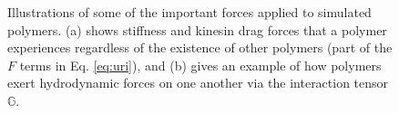 \documentclass[11pt]{ucthesis}
\begin{document}
\begin{figure}
\centering
{}
\caption{Illustrations of some of the important forces applied to simulated polymers. (a) shows stiffness and kinesin drag forces that a polymer experiences regardless of the existence of other polymers (part of the $F$ terms in Eq. \ref{eq:uri}), and (b) gives an example of how polymers exert hydrodynamic forces on one another via the interaction tensor $\mathbb{G}$.\label{fig:forces}}
\end{figure}
\end{document}
